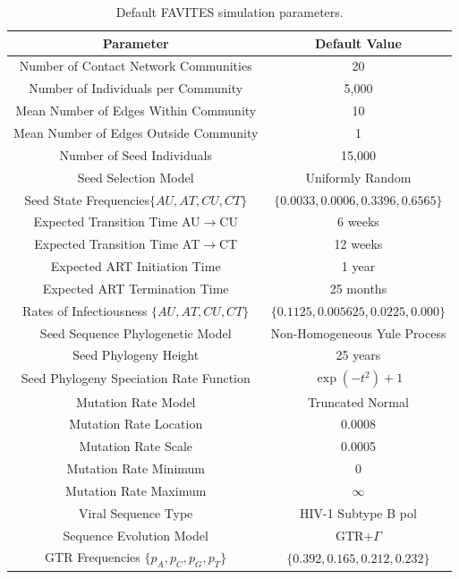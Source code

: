 \begin{table}[!ht] %
\caption[Full Simulation Parameters]{Default FAVITES simulation parameters.}
\vspace{-0.25in}
\begin{center}
\begin{tabular}{|c|c|}
\hline
\textbf{Parameter} & \textbf{Default Value}\\
\hline
Number of Contact Network Communities & 20\\
\hline
Number of Individuals per Community & 5,000\\
\hline
Mean Number of Edges Within Community & 10\\
\hline
Mean Number of Edges Outside Community & 1\\
\hline
Number of Seed Individuals & 15,000\\
\hline
Seed Selection Model & Uniformly Random\\
\hline
Seed State Frequencies$\{AU,AT,CU,CT\}$ & $\{0.0033,0.0006,0.3396,0.6565\}$\\
\hline
Expected Transition Time AU$\rightarrow$CU & 6 weeks\\
\hline
Expected Transition Time AT$\rightarrow$CT & 12 weeks\\
\hline
Expected \gls{ART} Initiation Time & 1 year\\
\hline
Expected \gls{ART} Termination Time & 25 months\\
\hline
Rates of Infectiousness $\{AU,AT,CU,CT\}$ & $\{0.1125,0.005625,0.0225,0.000\}$\\
\hline
Seed Sequence Phylogenetic Model & Non-Homogeneous Yule Process\\
\hline
Seed Phylogeny Height & 25 years\\
\hline
Seed Phylogeny Speciation Rate Function & $\exp(-t^2)+1$\\
\hline
Mutation Rate Model & Truncated Normal\\
\hline
Mutation Rate Location & 0.0008\\
\hline
Mutation Rate Scale & 0.0005\\
\hline
Mutation Rate Minimum & 0\\
\hline
Mutation Rate Maximum & $\infty$\\
\hline
Viral Sequence Type & \gls{HIV}-1 Subtype B \gls{pol}\\
\hline
Sequence Evolution Model & \gls{GTR}+$\Gamma$\\
\hline
\gls{GTR} Frequencies $\{p_A,p_C,p_G,p_T\}$ & $\{0.392,0.165,0.212,0.232\}$\\

\end{tabular}
\end{center}
\end{table}
